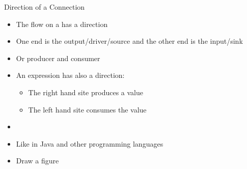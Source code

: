 
\begin{frame}[fragile]{Direction of a Connection}
\begin{itemize}
\item The flow on a  has a direction
\item One end is the output/driver/source and the other end is the input/sink
\item Or producer and consumer
\item An expression has also a direction:
\begin{itemize}
\item The right hand site produces a value
\item The left hand site consumes the value
\end{itemize}
\item {}
\item Like in Java and other programming languages
\item Draw a figure
\end{itemize}
\end{frame}

